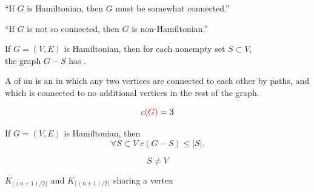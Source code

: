 
\begin{frame}{}
  \begin{center}
    ``If $G$ is Hamiltonian, then $G$ must be somewhat connected.''


    \pause
    ``If $G$ is not so connected, then $G$ is non-Hamiltonian.''
  \end{center}
\end{frame}

\begin{frame}{}
  \begin{theorem}{}
    If $G = (V, E)$ is Hamiltonian,
    then for each nonempty set $S \subset V$, \\[3pt]
    the graph $G - S$ has  .
  \end{theorem}
\end{frame}

\begin{frame}{}
  \begin{definition}
    A  of an 
    is an  in which any two vertices are connected to each other by paths,
    and which is connected to no additional vertices in the rest of the graph.
  \end{definition}

  \vspace{0.20cm}

  \pause
  \vspace{-0.20cm}
  \[
    \textcolor{red}{c(G)} = 3
  \]
\end{frame}

\begin{frame}{}
  \begin{theorem}{}
    If $G = (V, E)$ is Hamiltonian, then
    \[
      \forall S \subset V\; c(G - S) \le |S|.
    \]
  \end{theorem}

  \pause
  \vspace{0.30cm}
  \[
    S \neq V
  \]

  \pause
  \vspace{0.30cm}
  \begin{center}
    $K_{\lfloor (n + 1)/ 2 \rfloor}$ and $K_{\lceil (n+1)/2 \rceil}$
    sharing a vertex
  \end{center}
\end{frame}

